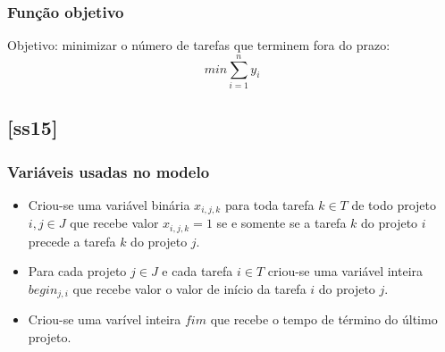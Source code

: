 \documentclass[11pt,letterpaper]{article}
\begin{document}
\subsubsection*{Função objetivo}
Objetivo: minimizar o número de tarefas que terminem fora do prazo:
\begin{equation}
min\sum_{i=1}^{n}y_i
\end{equation}

\subsection{{[}ss15{]}}
\subsubsection*{Variáveis usadas no modelo}
\begin{itemize}
\item Criou-se uma variável binária $x_{i,j,k}$ para toda tarefa $k \in T$ de todo projeto $i, j  \in J$ que recebe valor $x_{i,j,k}=1$ se e somente se a tarefa $k$ do projeto $i$ precede a tarefa $k$ do projeto $j$.

\item Para cada projeto $j \in J$ e cada tarefa $i \in T$ criou-se uma variável inteira $begin_{j,i}$
  que recebe valor o valor de início da tarefa $i$ do projeto $j$.

\item Criou-se uma varível inteira $fim$ que recebe o tempo de término
  do último projeto.

\end{itemize}
\end{document}
